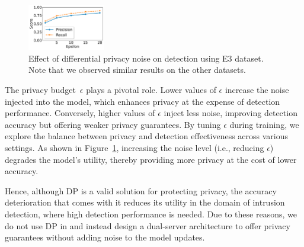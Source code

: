 \begin{figure}[!t]
  \centering
  \includegraphics[width=0.3\textwidth]{fig/epsvsscore.pdf}
  \caption{Effect of differential privacy noise on detection using E3 dataset. Note that we observed similar results on the other datasets.}
  \label{epsvsscore}
  \vspace{-2ex}
\end{figure}


The privacy budget~$\epsilon$ plays a pivotal role. Lower values of $\epsilon$ increase the noise injected into the model, which enhances privacy at the expense of detection performance. Conversely, higher values of $\epsilon$ inject less noise, improving detection accuracy but offering weaker privacy guarantees. By tuning $\epsilon$ during training, we explore the balance between privacy and detection effectiveness across various settings. As shown in Figure~\ref{epsvsscore}, increasing the noise level (i.e., reducing $\epsilon$) degrades the model’s utility, thereby providing more privacy at the cost of lower accuracy.

Hence, although DP is a valid solution for protecting privacy, the accuracy deterioration that comes with it reduces its utility in the domain of intrusion detection, where high detection performance is needed. Due to these reasons, we do not use DP in \Sys and instead design a dual-server architecture to offer privacy guarantees without adding noise to the model updates.


